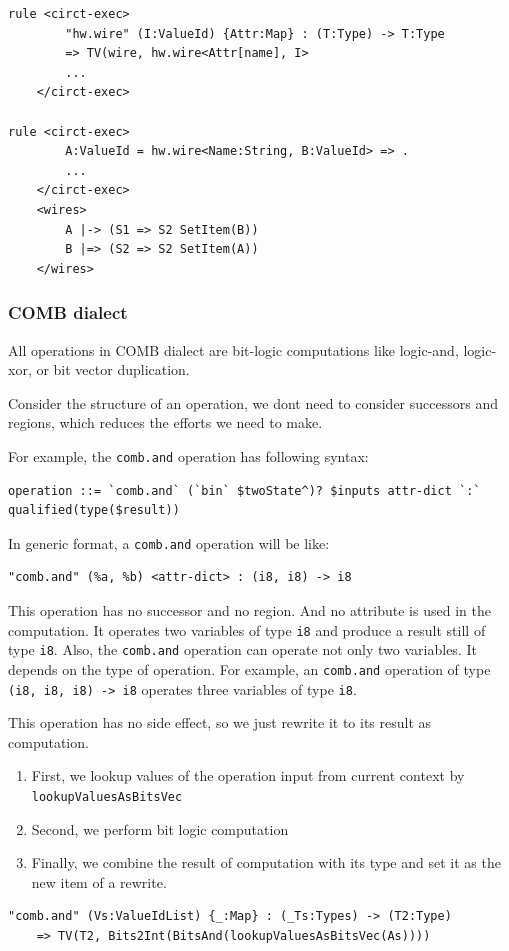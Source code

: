 \begin{lstlisting}
rule <circt-exec> 
        "hw.wire" (I:ValueId) {Attr:Map} : (T:Type) -> T:Type
        => TV(wire, hw.wire<Attr[name], I>
        ...
    </circt-exec>

rule <circt-exec> 
        A:ValueId = hw.wire<Name:String, B:ValueId> => .
        ...
    </circt-exec>
    <wires>
        A |-> (S1 => S2 SetItem(B))
        B |=> (S2 => S2 SetItem(A))
    </wires>
\end{lstlisting}

\subsubsection{COMB dialect}

All operations in COMB dialect are bit-logic computations like logic-and, logic-xor, or bit vector duplication. 

Consider the structure of an operation, we dont need to consider successors and regions, which reduces the efforts we need to make.

For example, the \verb|comb.and| operation has following syntax:
\begin{lstlisting}
operation ::= `comb.and` (`bin` $twoState^)? $inputs attr-dict `:` qualified(type($result))
\end{lstlisting}

In generic format, a \verb|comb.and| operation will be like:
\begin{lstlisting}
"comb.and" (%a, %b) <attr-dict> : (i8, i8) -> i8
\end{lstlisting}
This operation has no successor and no region. And no attribute is used in the computation. It operates two variables of type \verb|i8| and produce a result still of type \verb|i8|.
Also, the \verb|comb.and| operation can operate not only two variables. It depends on the type of operation. For example, an \verb|comb.and| operation of type \verb|(i8, i8, i8) -> i8| operates three variables of type \verb|i8|.

This operation has no side effect, so we just rewrite it to its result as computation.
\begin{enumerate}
    \item First, we lookup values of the operation input from current context by \verb|lookupValuesAsBitsVec|
    \item Second, we perform bit logic computation
    \item Finally, we combine the result of computation with its type and set it as the new item of a rewrite.
\end{enumerate}
\begin{lstlisting}
"comb.and" (Vs:ValueIdList) {_:Map} : (_Ts:Types) -> (T2:Type)
    => TV(T2, Bits2Int(BitsAnd(lookupValuesAsBitsVec(As))))
\end{lstlisting}

